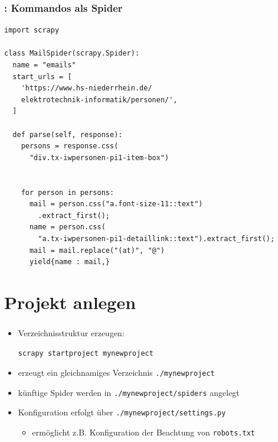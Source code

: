 \documentclass{beamer}
\begin{document}
\begin{frame}
	\frametitle{\insertsection{}: \insertsubsection{} Kommandos als Spider}

\begin{lstlisting}  
import scrapy

class MailSpider(scrapy.Spider):
  name = "emails"
  start_urls = [
    'https://www.hs-niederrhein.de/
    elektrotechnik-informatik/personen/',
  ]

  def parse(self, response):
    persons = response.css(
      "div.tx-iwpersonen-pi1-item-box")


    for person in persons:
      mail = person.css("a.font-size-11::text")
        .extract_first();
      name = person.css(
        "a.tx-iwpersonen-pi1-detaillink::text").extract_first();
      mail = mail.replace("(at)", "@")
      yield{name : mail,}
      \end{lstlisting}
\end{frame}

\section{Projekt anlegen}
\begin{frame}[fragile]
	\frametitle{\insertsection}
	\begin{itemize}
		\item Verzeichnisstruktur erzeugen:
			\begin{lstlisting}
scrapy startproject mynewproject
			\end{lstlisting}
		\item erzeugt ein gleichnamiges Verzeichnis \verb|./mynewproject| 
		\item künftige Spider werden in \verb|./mynewproject/spiders| angelegt
		\item Konfiguration erfolgt über \verb|./mynewproject/settings.py|
		\begin{itemize}
		  \item ermöglicht z.B. Konfiguration der Beachtung von \lstinline|robots.txt|
  		\end{itemize}
	\end{itemize}
\end{frame}

\end{document}

